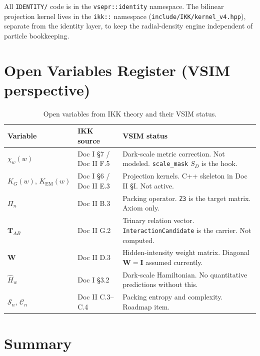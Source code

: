 \documentclass[11pt, a4paper, oneside]{article}
\newcommand{\Pack}{\Pi}
\theoremstyle{definition}
\theoremstyle{remark}
\begin{document}
All \texttt{IDENTITY/} code is in the \texttt{vsepr::identity} namespace.
The bilinear projection kernel lives in the \texttt{ikk::} namespace
(\texttt{include/IKK/kernel\_v4.hpp}), separate from the identity layer,
to keep the radial-density engine independent of particle bookkeeping.

\section{Open Variables Register (VSIM perspective)}

\begin{table}[h]
  \centering
  \begin{tabularx}{\linewidth}{l l X}
	\toprule
	Variable & IKK source & VSIM status \\
	\midrule
	$\chi_w(w)$ & Doc I \S7 / Doc II F.5
	  & Dark-scale metric correction. Not modeled. \texttt{scale\_mask} $S_D$ is the hook. \\
	$K_G(w),\, K_\text{EM}(w)$ & Doc I \S6 / Doc II E.3
	  & Projection kernels. C++ skeleton in Doc II \S I. Not active. \\
	$\Pack_n$ & Doc II B.3
	  & Packing operator. \texttt{Z3} is the target matrix. Axiom only. \\
	$\mathbf{T}_{AB}$ & Doc II G.2
	  & Trinary relation vector. \texttt{InteractionCandidate} is the carrier. Not computed. \\
	$\mathbf{W}$ & Doc II D.3
	  & Hidden-intensity weight matrix. Diagonal $\mathbf{W}=\mathbf{I}$ assumed currently. \\
	$\hat{H}_w$ & Doc I \S3.2
	  & Dark-scale Hamiltonian. No quantitative predictions without this. \\
	$\mathcal{S}_n,\, \mathcal{C}_n$ & Doc II C.3--C.4
	  & Packing entropy and complexity. Roadmap item. \\
	\bottomrule
  \end{tabularx}
  \caption{Open variables from IKK theory and their VSIM status.}
  \label{tab:open-vars}
\end{table}

\section{Summary}
\end{document}
